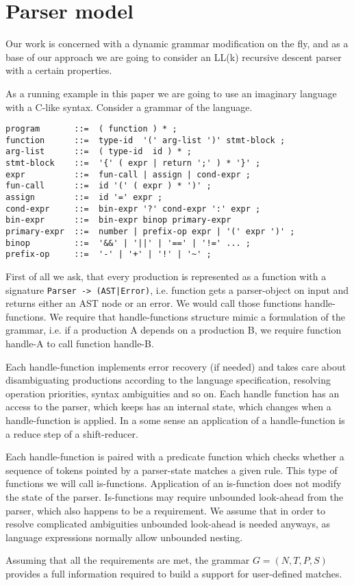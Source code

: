 \section{\label{sec:parser}Parser model}

Our work is concerned with a dynamic grammar modification on the
fly, and as a base of our approach we are going to consider an
LL(k) recursive descent parser with a certain properties.

As a running example in this paper we are going to use an imaginary
language with a C-like syntax.  Consider a grammar of the language.

\begin{verbatim}
program       ::=  ( function ) * ;
function      ::=  type-id  '(' arg-list ')' stmt-block ;
arg-list      ::=  ( type-id  id ) * ;
stmt-block    ::=  '{' ( expr | return ';' ) * '}' ;
expr          ::=  fun-call | assign | cond-expr ;
fun-call      ::=  id '(' ( expr ) * ')' ;
assign        ::=  id '=' expr ;
cond-expr     ::=  bin-expr '?' cond-expr ':' expr ;
bin-expr      ::=  bin-expr binop primary-expr
primary-expr  ::=  number | prefix-op expr | '(' expr ')' ;
binop         ::=  '&&' | '||' | '==' | '!=' ... ;
prefix-op     ::=  '-' | '+' | '!' | '~' ;
\end{verbatim}

First of all we ask, that every production is represented as a function
with a signature \verb/Parser -> (AST|Error)/, i.e. function gets a
parser-object on input and returns either an AST node or an error.
We would call those functions handle-functions. We require that 
handle-functions structure mimic a formulation of the grammar,
i.e. if a production A depends on a production B, we require 
function handle-A to call function handle-B.

Each handle-function implements error recovery (if needed) and takes
care about disambiguating productions according to the language
specification, resolving operation priorities, syntax ambiguities
and so on.  Each handle function has an access to the parser, which
keeps has an internal state, which changes when a handle-function
is applied.  In a some sense an application of a handle-function
is a reduce step of a shift-reducer.

Each handle-function is paired with a predicate function which checks
whether a sequence of tokens pointed by a parser-state matches a 
given rule.  This type of functions we will call is-functions.
Application of an is-function does not modify the state of
the parser.  Is-functions may require unbounded look-ahead from 
the parser, which also happens to be a requirement.  We assume that in
order to resolve complicated ambiguities unbounded look-ahead is needed
anyways, as language expressions normally allow unbounded nesting.


Assuming that all the requirements are met, the grammar $G = (N, T, P,
S)$ provides a full information required to build a support for
user-defined matches.

